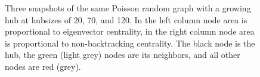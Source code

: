 \documentclass[twocolumn,prl,superscriptaddress]{revtex4}
\begin{document}
\begin{figure}
\begin{center}
\end{center}
\caption{Three snapshots of the same Poisson random graph with a growing hub at hubsizes of 20, 70, and 120. In the left column node area is proportional to eigenvector centrality, in the right column node area is proportional to non-backtracking centrality. The black node is the hub, the green (light grey) nodes are its neighbors, and all other nodes are red (grey).}
\label{fig:transition}
\end{figure}
\end{document}
